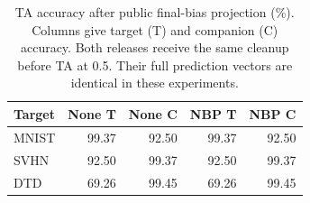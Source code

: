 \begin{table}[!t]
\centering
\small
\setlength{\tabcolsep}{4pt}
\caption{TA accuracy after public final-bias projection (\%). Columns give target (T) and companion (C) accuracy. Both releases receive the same cleanup before TA at 0.5. Their full prediction vectors are identical in these experiments.}
\label{tab:cleanup}
\begin{tabular}{lrrrr}
\toprule
Target & None T & None C & NBP T & NBP C \\
\midrule
MNIST & 99.37 & 92.50 & 99.37 & 92.50 \\
SVHN & 92.50 & 99.37 & 92.50 & 99.37 \\
DTD & 69.26 & 99.45 & 69.26 & 99.45 \\
\bottomrule
\end{tabular}
\end{table}
